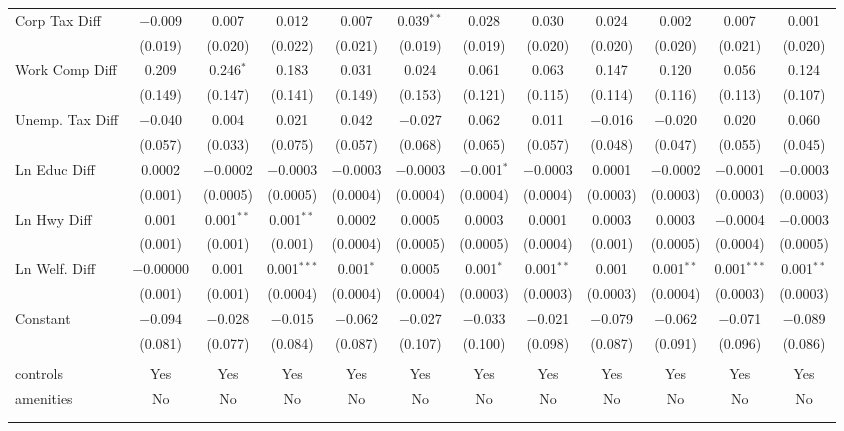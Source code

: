 \begin{table}[!htbp]
\begin{tabular}{@{\extracolsep{5pt}}lccccccccccc}
  Corp Tax Diff & $-$0.009 & 0.007 & 0.012 & 0.007 & 0.039$^{**}$ & 0.028 & 0.030 & 0.024 & 0.002 & 0.007 & 0.001 \\ 
  & (0.019) & (0.020) & (0.022) & (0.021) & (0.019) & (0.019) & (0.020) & (0.020) & (0.020) & (0.021) & (0.020) \\ 
  Work Comp Diff & 0.209 & 0.246$^{*}$ & 0.183 & 0.031 & 0.024 & 0.061 & 0.063 & 0.147 & 0.120 & 0.056 & 0.124 \\ 
  & (0.149) & (0.147) & (0.141) & (0.149) & (0.153) & (0.121) & (0.115) & (0.114) & (0.116) & (0.113) & (0.107) \\ 
  Unemp. Tax Diff & $-$0.040 & 0.004 & 0.021 & 0.042 & $-$0.027 & 0.062 & 0.011 & $-$0.016 & $-$0.020 & 0.020 & 0.060 \\ 
  & (0.057) & (0.033) & (0.075) & (0.057) & (0.068) & (0.065) & (0.057) & (0.048) & (0.047) & (0.055) & (0.045) \\ 
  Ln Educ Diff & 0.0002 & $-$0.0002 & $-$0.0003 & $-$0.0003 & $-$0.0003 & $-$0.001$^{*}$ & $-$0.0003 & 0.0001 & $-$0.0002 & $-$0.0001 & $-$0.0003 \\ 
  & (0.001) & (0.0005) & (0.0005) & (0.0004) & (0.0004) & (0.0004) & (0.0004) & (0.0003) & (0.0003) & (0.0003) & (0.0003) \\ 
  Ln Hwy Diff & 0.001 & 0.001$^{**}$ & 0.001$^{**}$ & 0.0002 & 0.0005 & 0.0003 & 0.0001 & 0.0003 & 0.0003 & $-$0.0004 & $-$0.0003 \\ 
  & (0.001) & (0.001) & (0.001) & (0.0004) & (0.0005) & (0.0005) & (0.0004) & (0.001) & (0.0005) & (0.0004) & (0.0005) \\ 
  Ln Welf. Diff & $-$0.00000 & 0.001 & 0.001$^{***}$ & 0.001$^{*}$ & 0.0005 & 0.001$^{*}$ & 0.001$^{**}$ & 0.001 & 0.001$^{**}$ & 0.001$^{***}$ & 0.001$^{**}$ \\ 
  & (0.001) & (0.001) & (0.0004) & (0.0004) & (0.0004) & (0.0003) & (0.0003) & (0.0003) & (0.0004) & (0.0003) & (0.0003) \\ 
  Constant & $-$0.094 & $-$0.028 & $-$0.015 & $-$0.062 & $-$0.027 & $-$0.033 & $-$0.021 & $-$0.079 & $-$0.062 & $-$0.071 & $-$0.089 \\ 
  & (0.081) & (0.077) & (0.084) & (0.087) & (0.107) & (0.100) & (0.098) & (0.087) & (0.091) & (0.096) & (0.086) \\ 
 \hline \\[-1.8ex] 
controls & Yes & Yes & Yes & Yes & Yes & Yes & Yes & Yes & Yes & Yes & Yes \\ 
amenities & No & No & No & No & No & No & No & No & No & No & No \\ 
\hline \\[-1.8ex] 
\hline 
\hline \\[-1.8ex] 
\end{tabular} 
\end{table} 
